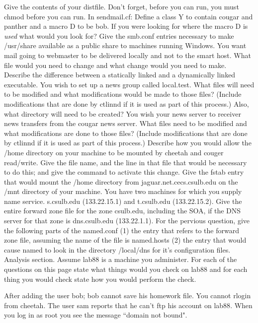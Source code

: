 Give the contents of your {\ltt{}distfile}.
Don't forget, before you can run, you must {\ltt{}chmod} before you can run.
\vskip 1.4in
\ques
In {\ltt{}sendmail.cf}:
Define a class {\ltt{}Y} to contain {\ltt{}cougar} and {\ltt{}panther}
and a macro {\ltt{}D} to be {\ltt{}bob}.
If you were looking for where the macro D is {\it used} what would you look for?
\vskip 1.6in
\ques
Give the {\ltt{}smb.conf} entries necessary to make
{\ltt{}/usr/share} available as a public share to
machines running Windows.
\vskip 1.5in
\vfill\eject
\ques
You want mail going to {\ltt{}webmaster} to be delivered locally
and not to the smart host.
What file would you need to change and what change would you need to make.
\vskip 1.0in
\ques
Describe the difference between a statically linked and a dynamically
linked executable.
\vskip 1.0in
\ques
You wish to set up a news group called {\ltt{}local.test}.
What files will need to be modified
and what modifications would be made to those files?
(Include modifications that are done by {\ltt{}ctlinnd} if it is
used as part of this process.)
Also, what directory will need to be created?
\vskip 2.7in
\ques
You wish your news server to receiver news transfers from the
{\ltt{}cougar} news server.
What files need to be modified and what modifications are done to those files?
(Include modifications that are done by {\ltt{}ctlinnd} if it is used
as part of this process.)
\vskip 2.2in
\vfill\eject
\ques
Describe how you would allow
the {\ltt{}/home} directory on your machine to be mounted
by {\ltt{}cheetah} and {\ltt{}couger} read/write.
Give the file name, and the line in that file that would be
necessary to do this; and give the command to activate this change.
\vskip 0.9in
\ques
Give the {\ltt{}fstab} entry that would mount
the {\ltt{}/home} directory from {\ltt{}jaguar.net.cecs.csulb.edu}
on the {\ltt{}/mnt} directory of your machine.
\vskip 0.7in
\ques
You have two machines for which you supply name service.
{\ltt{}s.csulb.edu} (133.22.15.1) and 
{\ltt{}t.csulb.edu} (133.22.15.2).
Give the entire forward zone file for the zone {\ltt{}csulb.edu},
including the SOA, if the DNS server for that zone
is {\ltt{}dns.csulb.edu} ({\ltt{}133.22.1.1}).
\vskip 4.2in
\ques
For the pervious question, give the following parts of the {\ltt{}named.conf}
(1) the entry that refers to the forward zone file, assuming the
name of the file is {\ltt{}named.hosts}
(2) the entry that would cause named to look in the directory
{\ltt{}/local/dns} for it's configuration files.
\vfill\eject
Analysis section. Assume {\ltt{}lab88} is a machine you administer.
For each of the questions on this page
state what things would you check on {\ltt{}lab88}
and for each thing you would check state how you would perform the check.

\ques
After adding the user {\ltt{}bob};
{\ltt{}bob} cannot save his homework file.
\vfill
\ques
You cannot rlogin from {\ltt{}cheetah}.
\vfill
\ques
The user {\ltt{}sam} reports that he can't ftp his account
on {\ltt{}lab88}.
\vfill
\ques
When you log in as {\ltt{}root} you see the message
``domain not bound".
\bye
